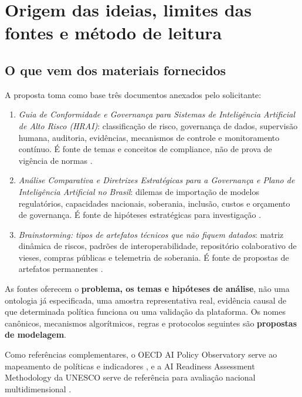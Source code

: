 \documentclass[12pt,a4paper,oneside,english,brazil]{abntex2}
\newcommand{\eng}[1]{\textit{#1}}
\begin{document}

\chapter{Origem das ideias, limites das fontes e método de leitura}
\section{O que vem dos materiais fornecidos}
A proposta toma como base três documentos anexados pelo solicitante:\par
\begin{enumerate}
\item \eng{Guia de Conformidade e Governança para Sistemas de Inteligência Artificial de Alto Risco (HRAI)}: classificação de risco, governança de dados, supervisão humana, auditoria, evidências, mecanismos de controle e monitoramento contínuo. É fonte de temas e conceitos de compliance, não de prova de vigência de normas \cite{estudo-guia-hrai}.
\item \eng{Análise Comparativa e Diretrizes Estratégicas para a Governança e Plano de Inteligência Artificial no Brasil}: dilemas de importação de modelos regulatórios, capacidades nacionais, soberania, inclusão, custos e orçamento de governança. É fonte de hipóteses estratégicas para investigação \cite{estudo-comparativo}.
\item \eng{Brainstorming: tipos de artefatos técnicos que não fiquem datados}: matriz dinâmica de riscos, padrões de interoperabilidade, repositório colaborativo de vieses, compras públicas e telemetria de soberania. É fonte de propostas de artefatos permanentes \cite{estudo-brainstorm}.
\end{enumerate}
As fontes oferecem o \textbf{problema, os temas e hipóteses de análise}, não uma ontologia já especificada, uma amostra representativa real, evidência causal de que determinada política funciona ou uma validação da plataforma. Os nomes canônicos, mecanismos algorítmicos, regras e protocolos seguintes são \textbf{propostas de modelagem}.

Como referências complementares, o OECD AI Policy Observatory serve ao mapeamento de políticas e indicadores \cite{oecd-ai}, e a AI Readiness Assessment Methodology da UNESCO serve de referência para avaliação nacional multidimensional \cite{unesco-ram}.
\end{document}
